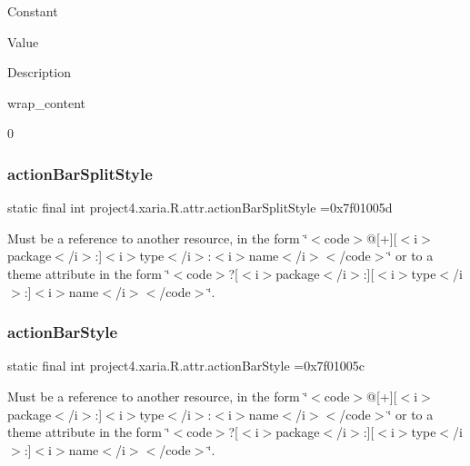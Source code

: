 Constant

Value

Description 

{\ttfamily wrap\+\_\+content}

0\mbox{\label{classproject4_1_1xaria_1_1R_1_1attr_a278ac5f613b8353d0cb9ba569d288990}} 
\subsubsection{\texorpdfstring{action\+Bar\+Split\+Style}{actionBarSplitStyle}}
{\footnotesize\ttfamily static final int project4.\+xaria.\+R.\+attr.\+action\+Bar\+Split\+Style =0x7f01005d\hspace{0.3cm}{\ttfamily [static]}}

Must be a reference to another resource, in the form \char`\"{}$<$code$>$@\mbox{[}+\mbox{]}\mbox{[}$<$i$>$package$<$/i$>$\+:\mbox{]}$<$i$>$type$<$/i$>$\+:$<$i$>$name$<$/i$>$$<$/code$>$\char`\"{} or to a theme attribute in the form \char`\"{}$<$code$>$?\mbox{[}$<$i$>$package$<$/i$>$\+:\mbox{]}\mbox{[}$<$i$>$type$<$/i$>$\+:\mbox{]}$<$i$>$name$<$/i$>$$<$/code$>$\char`\"{}. \mbox{\label{classproject4_1_1xaria_1_1R_1_1attr_a2b8dce34674190bbb904ab8f5002adba}} 
\subsubsection{\texorpdfstring{action\+Bar\+Style}{actionBarStyle}}
{\footnotesize\ttfamily static final int project4.\+xaria.\+R.\+attr.\+action\+Bar\+Style =0x7f01005c\hspace{0.3cm}{\ttfamily [static]}}

Must be a reference to another resource, in the form \char`\"{}$<$code$>$@\mbox{[}+\mbox{]}\mbox{[}$<$i$>$package$<$/i$>$\+:\mbox{]}$<$i$>$type$<$/i$>$\+:$<$i$>$name$<$/i$>$$<$/code$>$\char`\"{} or to a theme attribute in the form \char`\"{}$<$code$>$?\mbox{[}$<$i$>$package$<$/i$>$\+:\mbox{]}\mbox{[}$<$i$>$type$<$/i$>$\+:\mbox{]}$<$i$>$name$<$/i$>$$<$/code$>$\char`\"{}. \mbox{\label{classproject4_1_1xaria_1_1R_1_1attr_a037f4555c1943e55aa1d65714df93301}} 
